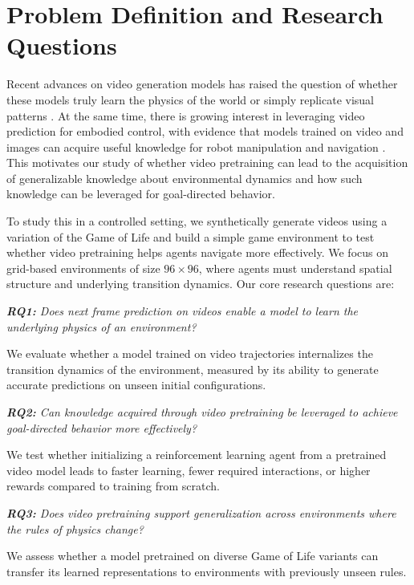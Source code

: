 \section{Problem Definition and Research Questions}
Recent advances on video generation models has raised the question of whether these models truly learn the physics of the world or simply replicate visual patterns \citep{liu2024sorareviewbackgroundtechnology}. At the same time, there is growing interest in leveraging video prediction for embodied control, with evidence that models trained on video and images can acquire useful knowledge for robot manipulation and navigation \citep{du2023learninguniversalpoliciestextguided, kim2024openvlaopensourcevisionlanguageactionmodel}. This motivates our study of whether video pretraining can lead to the acquisition of generalizable knowledge about environmental dynamics and how such knowledge can be leveraged for goal-directed behavior.

To study this in a controlled setting, we synthetically generate videos using a variation of the Game of Life \citep{gardner1970life} and build a simple game environment to test whether video pretraining helps agents navigate more effectively. We focus on grid-based environments of size $96 \times 96$, where agents must understand spatial structure and underlying transition dynamics. Our core research questions are:

\textit{\textbf{RQ1:} Does next frame prediction on videos enable a model to learn the underlying physics of an environment?}

We evaluate whether a model trained on video trajectories internalizes the transition dynamics of the environment, measured by its ability to generate accurate predictions on unseen initial configurations.

\textit{\textbf{RQ2:} Can knowledge acquired through video pretraining be leveraged to achieve goal-directed behavior more effectively?}

We test whether initializing a reinforcement learning agent from a pretrained video model leads to faster learning, fewer required interactions, or higher rewards compared to training from scratch.

\textit{\textbf{RQ3:} Does video pretraining support generalization across environments where the rules of physics change?}

We assess whether a model pretrained on diverse Game of Life variants can transfer its learned representations to environments with previously unseen rules.

